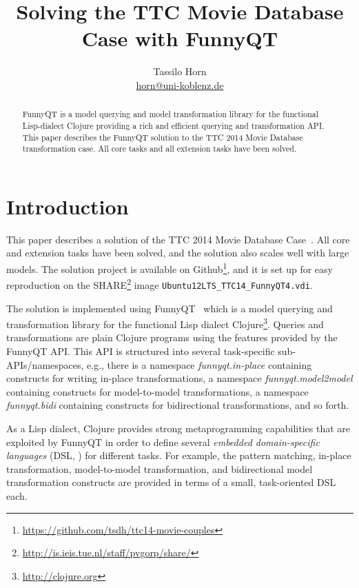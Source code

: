 \documentclass[a4paper]{article}
\title{Solving the TTC Movie Database Case with FunnyQT}
\author{Tassilo Horn\\
  \href{mailto:horn@uni-koblenz.de}{horn@uni-koblenz.de}}
\begin{document}
\maketitle

\begin{abstract}
  FunnyQT is a model querying and model transformation library for the
  functional Lisp-dialect Clojure providing a rich and efficient querying and
  transformation API.  This paper describes the FunnyQT solution to the TTC
  2014 Movie Database transformation case.  All core tasks and all extension
  tasks have been solved.
\end{abstract}


\section{Introduction}
\label{sec:introduction}

This paper describes a solution of the TTC 2014 Movie Database
Case~\cite{movies-case-desc}.  All core and extension tasks have been solved,
and the solution also scales well with large models.  The solution project is
available on
Github\footnote{\url{https://github.com/tsdh/ttc14-movie-couples}}, and it is
set up for easy reproduction on the
SHARE\footnote{\url{http://is.ieis.tue.nl/staff/pvgorp/share/}} image
\texttt{Ubuntu12LTS\_TTC14\_FunnyQT4.vdi}.

The solution is implemented using FunnyQT~\cite{Horn2013MQWFQ} which is a model
querying and transformation library for the functional Lisp dialect
Clojure\footnote{\url{http://clojure.org}}.  Queries and transformations are
plain Clojure programs using the features provided by the FunnyQT API.  This
API is structured into several task-specific sub-APIs/namespaces, e.g., there
is a namespace \emph{funnyqt.in-place} containing constructs for writing
in-place transformations, a namespace \emph{funnyqt.model2model} containing
constructs for model-to-model transformations, a namespace \emph{funnyqt.bidi}
containing constructs for bidirectional transformations, and so forth.

As a Lisp dialect, Clojure provides strong metaprogramming capabilities that
are exploited by FunnyQT in order to define several \emph{embedded
  domain-specific languages} (DSL, \cite{book:Fowler2010DSL}) for different
tasks.  For example, the pattern matching, in-place transformation,
model-to-model transformation, and bidirectional model transformation
constructs are provided in terms of a small, task-oriented DSL each.
\end{document}
